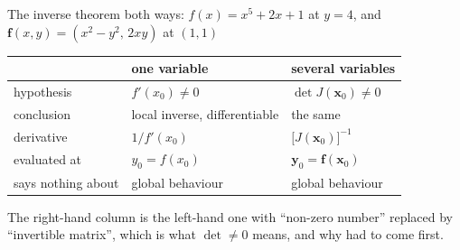 \begin{worked}{The inverse theorem both ways: $f(x)=x^{5}+2x+1$ at $y=4$, and $\mathbf{f}(x,y)=(x^{2}-y^{2},\,2xy)$ at $(1,1)$}
\begin{center}\footnotesize
\begin{tabular}{lll}
  \hline
   & one variable & several variables\\
  \hline
  hypothesis & $f'(x_{0})\neq0$ & $\det J(\mathbf{x}_{0})\neq0$\\
  conclusion & local inverse, differentiable & the same\\
  derivative & $1/f'(x_{0})$ & $\bigl[J(\mathbf{x}_{0})\bigr]^{-1}$\\
  evaluated at & $y_{0}=f(x_{0})$ & $\mathbf{y}_{0}=\mathbf{f}(\mathbf{x}_{0})$\\
  says nothing about & global behaviour & global behaviour\\
  \hline
\end{tabular}
\end{center}
The right-hand column is the left-hand one with ``non-zero number''
replaced by ``invertible matrix'', which is what $\det\neq0$ means, and
why  had to come first.
\end{worked}

